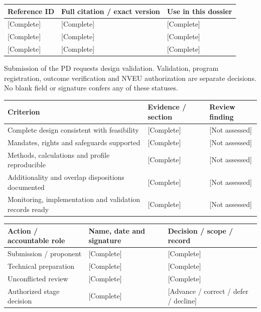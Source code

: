 {\sffamily\fontsize{8.3}{10.3}\selectfont\begin{longtable}{@{}P{29.69mm} P{82.48mm} P{52.79mm}@{}}
\toprule
\textbf{Reference ID} & \textbf{Full citation / exact version} & \textbf{Use in this dossier}\\\midrule\endhead
\rule{0pt}{7.7mm}[Complete] & [Complete] & [Complete]\\\hline
\rule{0pt}{7.7mm}[Complete] & [Complete] & [Complete]\\\hline
\rule{0pt}{7.7mm}[Complete] & [Complete] & [Complete]\\\hline
\end{longtable}}
\begin{Notice}Submission of the PD requests design validation. Validation, program registration, outcome verification and NVEU authorization are separate decisions. No blank field or signature confers any of these statuses.\end{Notice}
{\sffamily\fontsize{8.3}{10.3}\selectfont\begin{longtable}{@{}P{80.84mm} P{42.89mm} P{41.24mm}@{}}
\toprule
\textbf{Criterion} & \textbf{Evidence / section} & \textbf{Review finding}\\\midrule\endhead
\rule{0pt}{7.7mm}Complete design consistent with feasibility & [Complete] & [Not assessed]\\\hline
\rule{0pt}{7.7mm}Mandates, rights and safeguards supported & [Complete] & [Not assessed]\\\hline
\rule{0pt}{7.7mm}Methods, calculations and profile reproducible & [Complete] & [Not assessed]\\\hline
\rule{0pt}{7.7mm}Additionality and overlap dispositions documented & [Complete] & [Not assessed]\\\hline
\rule{0pt}{7.7mm}Monitoring, implementation and validation records ready & [Complete] & [Not assessed]\\\hline
\end{longtable}}
{\sffamily\fontsize{8.3}{10.3}\selectfont\begin{longtable}{@{}P{51.14mm} P{56.09mm} P{57.74mm}@{}}
\toprule
\textbf{Action / accountable role} & \textbf{Name, date and signature} & \textbf{Decision / scope / record}\\\midrule\endhead
\rule{0pt}{7.7mm}Submission / proponent & [Complete] & [Complete]\\\hline
\rule{0pt}{7.7mm}Technical preparation & [Complete] & [Complete]\\\hline
\rule{0pt}{7.7mm}Unconflicted review & [Complete] & [Complete]\\\hline
\rule{0pt}{7.7mm}Authorized stage decision & [Complete] & [Advance / correct / defer / decline]\\\hline
\end{longtable}}
